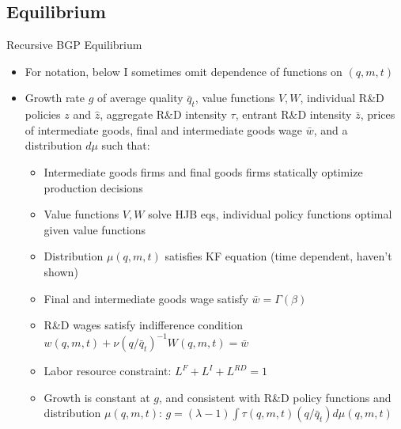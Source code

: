 \documentclass[english,usenames,dvipsnames]{beamer}
\begin{document}
\subsection{Equilibrium}
\begin{frame}{Recursive BGP Equilibrium}
\begin{itemize}
	\footnotesize
	\item For notation, below I sometimes omit dependence of functions on $(q,m,t)$
	\item Growth rate $g$ of average quality $\bar{q}_t$, value functions $V,W$, individual R\&D policies $z$ and $\hat{z}$, aggregate R\&D intensity $\tau$, entrant R\&D intensity $\bar{z}$, prices of intermediate goods, final and intermediate goods wage $\bar{w}$, and a distribution $d\mu$ such that: 
	\begin{itemize}
		\footnotesize
		\item Intermediate goods firms and final goods firms statically optimize production decisions
		\item Value functions $V,W$ solve HJB eqs, individual policy functions optimal given value functions
		\item Distribution $\mu(q,m,t)$ satisfies KF equation (time dependent, haven't shown)
		\item Final and intermediate goods wage satisfy $\bar{w} = \Gamma(\beta)$
		\item R\&D wages satisfy indifference condition $w(q,m,t) + \nu (q/\bar{q}_t)^{-1} W(q,m,t) = \bar{w}$
		\item Labor resource constraint: $L^F + L^I + L^{RD} = 1$
		\item Growth is constant at $g$, and consistent with R\&D policy functions and distribution $\mu(q,m,t)$: $g = (\lambda -1) \int \tau(q,m,t) (q/\bar{q}_t) d\mu(q,m,t)$
	\end{itemize} 
\end{itemize}
\end{frame}
\end{document}
